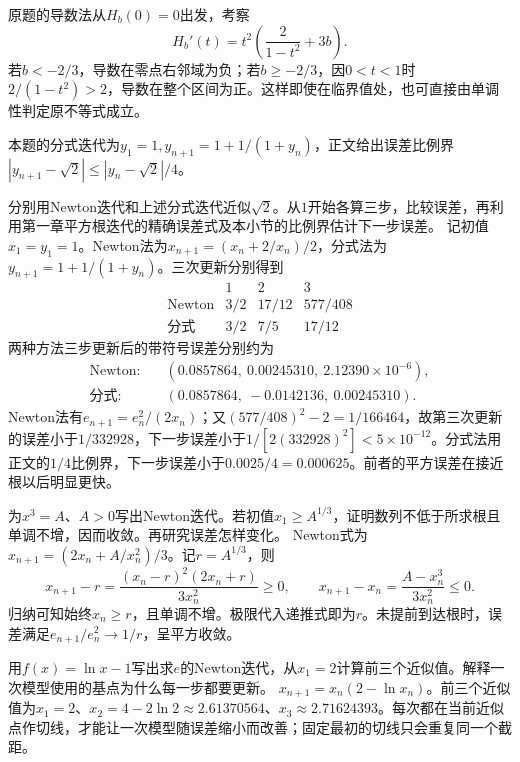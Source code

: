原题的导数法从\(H_b(0)=0\)出发，考察
\[
 H_b'(t)=t^2\left(\frac{2}{1-t^2}+3b\right).
\]
若\(b<-2/3\)，导数在零点右邻域为负；若\(b\ge-2/3\)，因\(0<t<1\)时\(2/(1-t^2)>2\)，导数在整个区间为正。这样即使在临界值处，也可直接由单调性判定原不等式成立。


本题的分式迭代为\(y_1=1,y_{n+1}=1+1/(1+y_n)\)，正文给出误差比例界\(|y_{n+1}-\sqrt2|\le|y_n-\sqrt2|/4\)。

分别用Newton迭代和上述分式迭代近似\(\sqrt2\)。从\(1\)开始各算三步，比较误差，再利用第一章平方根迭代的精确误差式及本小节的比例界估计下一步误差。
\solutionanswer
记初值\(x_1=y_1=1\)。Newton法为\(x_{n+1}=(x_n+2/x_n)/2\)，分式法为\(y_{n+1}=1+1/(1+y_n)\)。三次更新分别得到
\[
\begin{array}{c|ccc}
 &1&2&3\\\hline
\text{Newton}&3/2&17/12&577/408\\
\text{分式}&3/2&7/5&17/12
\end{array}
\]
两种方法三步更新后的带符号误差分别约为
\[
\begin{aligned}
 \text{Newton:}&\quad(0.0857864,\ 0.00245310,\ 2.12390\times10^{-6}),\\
 \text{分式:}&\quad(0.0857864,\ -0.0142136,\ 0.00245310).
\end{aligned}
\]
Newton法有\(e_{n+1}=e_n^2/(2x_n)\)；又\((577/408)^2-2=1/166464\)，故第三次更新的误差小于\(1/332928\)，下一步误差小于\(1/[2(332928)^2]<5\times10^{-12}\)。分式法用正文的\(1/4\)比例界，下一步误差小于\(0.0025/4=0.000625\)。前者的平方误差在接近根以后明显更快。


为\(x^3=A\)、\(A>0\)写出Newton迭代。若初值\(x_1\ge A^{1/3}\)，证明数列不低于所求根且单调不增，因而收敛。再研究误差怎样变化。
\solutionanswer
Newton式为\(x_{n+1}=(2x_n+A/x_n^2)/3\)。记\(r=A^{1/3}\)，则
\[
 x_{n+1}-r=\frac{(x_n-r)^2(2x_n+r)}{3x_n^2}\ge0,\qquad
 x_{n+1}-x_n=\frac{A-x_n^3}{3x_n^2}\le0.
\]
归纳可知始终\(x_n\ge r\)，且单调不增。极限代入递推式即为\(r\)。未提前到达根时，误差满足\(e_{n+1}/e_n^2\to1/r\)，呈平方收敛。


用\(f(x)=\ln x-1\)写出求\(e\)的Newton迭代，从\(x_1=2\)计算前三个近似值。解释一次模型使用的基点为什么每一步都要更新。
\solutionanswer
\(x_{n+1}=x_n(2-\ln x_n)\)。前三个近似值为\(x_1=2\)、\(x_2=4-2\ln2\approx2.61370564\)、\(x_3\approx2.71624393\)。每次都在当前近似点作切线，才能让一次模型随误差缩小而改善；固定最初的切线只会重复同一个截距。


